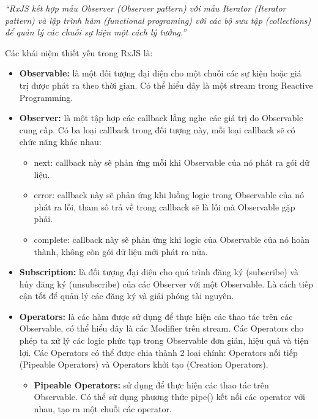 \textit{“RxJS kết hợp mẫu Observer (Observer pattern) với mẫu Iterator (Iterator pattern) và lập trình hàm (functional programing) với các bộ sưu tập (collections) để quản lý các chuỗi sự kiện một cách lý tưởng.”} \cite{chap4bib5}
\par

Các khái niệm thiết yếu trong RxJS là: \cite{chap4bib5}

\begin{itemize}
      \item \textbf{Observable:} là một đối tượng đại diện cho một chuỗi các sự kiện hoặc giá trị được phát ra theo thời gian.  Có thể hiểu đây là một stream trong Reactive Programming.
      \item \textbf{Observer:} là một tập hợp các callback lắng nghe các giá trị do Observable cung cấp.
            Có ba loại callback trong đối tượng này, mỗi loại callback sẽ có chức năng khác nhau:
            \begin{itemize}
                  \item next: callback này sẽ phản ứng mỗi khi Observable của nó phát ra gói dữ liệu.
                  \item error: callback này sẽ phản ứng khi luồng logic trong Observable của nó phát ra lỗi, tham số trả về trong callback sẽ là lỗi mà Observable gặp phải.
                  \item complete: callback này sẽ phản ứng khi logic của Observable của nó hoàn thành, không còn gói dữ liệu mới phát ra nữa.
            \end{itemize}
      \item \textbf{Subscription:} là đối tượng đại diện cho quá trình đăng ký (subscribe) và hủy đăng ký (unsubscribe) của các Observer với một Observable.
            Là cách tiếp cận tốt để quản lý các đăng ký và giải phóng tài nguyên.
      \item \textbf{Operators:} là các hàm được sử dụng để thực hiện các thao tác trên các Observable, có thể hiểu đây là các Modifier trên stream.
            Các Operators cho phép ta xử lý các logic phức tạp trong Observable đơn giản, hiệu quả và tiện lợi.
            Các Operators có thể được chia thành 2 loại chính: Operators nối tiếp (Pipeable Operators) và Operators khởi tạo (Creation Operators).
            \begin{itemize}
                  \item \textbf{Pipeable Operators:} sử dụng để thực hiện các thao tác trên Observable.
                        Có thể sử dụng phương thức pipe() kết nối các operator với nhau, tạo ra một chuỗi các operator.

\end{itemize}
\end{itemize}
